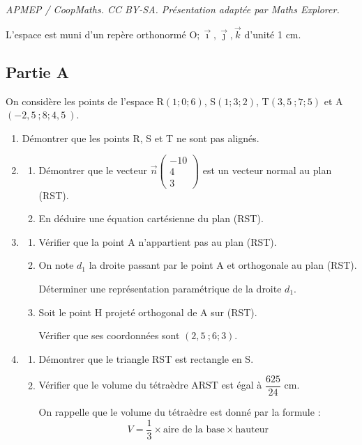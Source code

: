 \documentclass[10pt]{article}
\providecommand{\vect}[1]{\overrightarrow{#1}}
\providecommand{\np}[2][]{{#2~#1}}
\providecommand{\Oijk}{\(\mathrm{O};\vec{\imath},\vec{\jmath},\vec{k}\)}
\begin{document}
\noindent\textit{APMEP / CoopMaths. CC BY-SA. Présentation adaptée par Maths Explorer.}\par\medskip
L'espace est muni d'un repère orthonormé \Oijk{} d'unité 1 cm.

\subsection*{Partie A}

On considère les points de l'espace R$(1 ; 0 ; 6)$, S$(1 ; 3 ; 2)$, T$(\np{3,5} ; 7 ; 5)$ et A$(\np{-2,5} ; 8 ; \np{4,5})$.

\begin{enumerate}
	\item Démontrer que les points R, S et T ne sont pas alignés.

	\item \begin{enumerate}
		\item Démontrer que le vecteur $\vect{n} \begin{pmatrix}
			-10 \\ 4 \\ 3	\end{pmatrix}$ est un vecteur normal au plan (RST).

		\item En déduire une équation cartésienne du plan (RST).
	\end{enumerate}
	\item \begin{enumerate}
		\item Vérifier que la point A n'appartient pas au plan (RST).

		\item On note $d_1$ la droite passant par le point A et orthogonale au plan (RST).

		Déterminer une représentation paramétrique de la droite $d_1$.

		\item Soit le point H projeté orthogonal de A sur (RST).

		Vérifier que ses coordonnées sont $(\np{2,5} ; 6 ; 3)$.
	\end{enumerate}

	\item \begin{enumerate}
		\item Démontrer que le triangle RST est rectangle en S.

		\item Vérifier que le volume du tétraèdre ARST est égal à $\dfrac{625}{24}$ cm.

		On rappelle que le volume du tétraèdre est donné par la formule :
		\[ V= \frac{1}{3} \times \text{aire de la base} \times \text{hauteur}\]
	\end{enumerate}
\end{enumerate}
\end{document}
